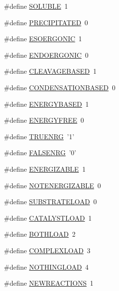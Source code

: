 \begin{DoxyCompactItemize}
\item 
\#define \hyperlink{a00066_a248fc87e714b5d729453d11fbeec8310}{S\-O\-L\-U\-B\-L\-E}~1
\item 
\#define \hyperlink{a00066_af270dce996bbfb82cc5d337af5b980e5}{P\-R\-E\-C\-I\-P\-I\-T\-A\-T\-E\-D}~0
\item 
\#define \hyperlink{a00066_ac23ad60cb24df0616d58202351b11e60}{E\-S\-O\-E\-R\-G\-O\-N\-I\-C}~1
\item 
\#define \hyperlink{a00066_a83346194720cacc0144e87246d23081b}{E\-N\-D\-O\-E\-R\-G\-O\-N\-I\-C}~0
\item 
\#define \hyperlink{a00066_a9c2a0137e4b97849150ab0842da3064c}{C\-L\-E\-A\-V\-A\-G\-E\-B\-A\-S\-E\-D}~1
\item 
\#define \hyperlink{a00066_ad722fbaf2330838fb9522c028141de6c}{C\-O\-N\-D\-E\-N\-S\-A\-T\-I\-O\-N\-B\-A\-S\-E\-D}~0
\item 
\#define \hyperlink{a00066_aca2c6e3c97c1e9728693b5c3c8c7f229}{E\-N\-E\-R\-G\-Y\-B\-A\-S\-E\-D}~1
\item 
\#define \hyperlink{a00066_a3efd65798c1856deacf187790b3f9ef5}{E\-N\-E\-R\-G\-Y\-F\-R\-E\-E}~0
\item 
\#define \hyperlink{a00066_a903e07285c96e6fbb9aa3577ddd1f327}{T\-R\-U\-E\-N\-R\-G}~'1'
\item 
\#define \hyperlink{a00066_ada187b73f4b4a504680ead4f86785021}{F\-A\-L\-S\-E\-N\-R\-G}~'0'
\item 
\#define \hyperlink{a00066_a2ce381beee4efd263052e93f9cbbfc77}{E\-N\-E\-R\-G\-I\-Z\-A\-B\-L\-E}~1
\item 
\#define \hyperlink{a00066_a04e076b71093a6dc76f99298d9cfeb9e}{N\-O\-T\-E\-N\-E\-R\-G\-I\-Z\-A\-B\-L\-E}~0
\item 
\#define \hyperlink{a00066_a5a83a3ca25e31afb2d58aa40c8b1fbbb}{S\-U\-B\-S\-T\-R\-A\-T\-E\-L\-O\-A\-D}~0
\item 
\#define \hyperlink{a00066_a7e521c899f69e37df3501fd0e652c517}{C\-A\-T\-A\-L\-Y\-S\-T\-L\-O\-A\-D}~1
\item 
\#define \hyperlink{a00066_afb6d1105a81463fbadceff0217332f68}{B\-O\-T\-H\-L\-O\-A\-D}~2
\item 
\#define \hyperlink{a00066_a7eb138e043eb9ec6d717c6178724bbaf}{C\-O\-M\-P\-L\-E\-X\-L\-O\-A\-D}~3
\item 
\#define \hyperlink{a00066_a15e77522039bb4bb52000b65773c83cf}{N\-O\-T\-H\-I\-N\-G\-L\-O\-A\-D}~4
\item 
\#define \hyperlink{a00066_afb2a947dfb1847f71649f82bc1bf0292}{N\-E\-W\-R\-E\-A\-C\-T\-I\-O\-N\-S}~1
\item 

\end{DoxyCompactItemize}
